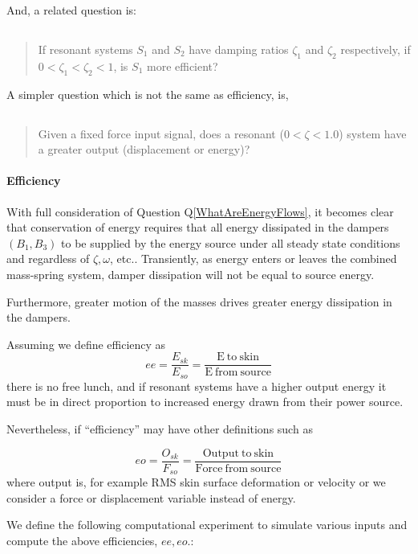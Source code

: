 \documentclass[letterpaper,11pt]{article}
\begin{document}
And, a related question is:
\subsection{}\label{ResQ2}
\begin{quotation}
If resonant systems  $S_1$ and $S_2$ have damping ratios $\zeta_1$ and $\zeta_2$ respectively, if
$0<\zeta_1 < \zeta_2<1$, is $S_1$ more efficient?
\end{quotation}

A simpler question which is not the same as efficiency, is,
\subsection{}\label{ResQ3}
\begin{quotation} Given a fixed force input signal,
does a resonant  ($0<\zeta<1.0$)  system have a greater output (displacement or energy)?
\end{quotation}


\paragraph{Efficiency}
With full consideration of Question Q\ref{WhatAreEnergyFlows}, it becomes
clear that conservation of energy requires that all energy dissipated in the
dampers $(B_1, B_3)$ to be supplied by the energy source under all steady state conditions
and regardless of $\zeta, \omega$, etc..
Transiently, as energy enters or leaves the combined mass-spring system, damper dissipation
will not be equal to source energy.

Furthermore,
greater motion of the masses drives greater energy dissipation in the dampers.

Assuming we define efficiency as
\[
ee = \frac {E_{sk}}  {E_{so}} = \frac {\mathrm{E~to ~skin} } { \mathrm {E~from~source} }
\]
there is
no free lunch, and if resonant systems have a higher output energy it must be
in direct proportion to increased energy drawn from their power source.

Nevertheless, if ``efficiency'' may have other definitions such as

\[
eo = \frac {O_{sk}}  {F_{so}} = \frac {\mathrm{Output~to ~skin} } { \mathrm {Force~from~source} }
\]
where output is, for example RMS skin surface deformation or velocity or
we consider a force or displacement variable instead of energy.

We define the following computational experiment to simulate various
inputs and compute the above efficiencies, $ee, eo$.:
\end{document}
